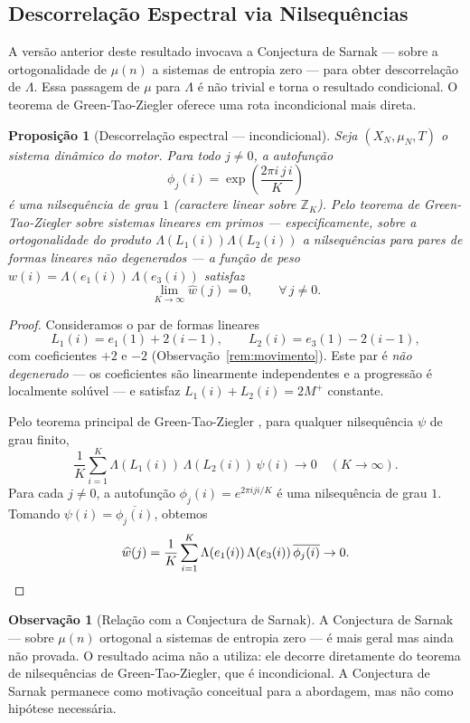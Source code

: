 \documentclass[12pt,a4paper]{article}
\newtheorem{proposition}[theorem]{Proposição}
\theoremstyle{definition}
\newtheorem{remark}[theorem]{Observação}
\newcommand{\Z}{\mathbb{Z}}
\begin{document}
	\subsection{Descorrelação Espectral via Nilsequências}
	
	A versão anterior deste resultado invocava a Conjectura de Sarnak
	\cite{sarnak} — sobre a ortogonalidade de $\mu(n)$ a sistemas de
	entropia zero — para obter descorrelação de $\Lambda$. Essa passagem
	de $\mu$ para $\Lambda$ é não trivial e torna o resultado condicional.
	O teorema de Green-Tao-Ziegler \cite{greentaoziegler} oferece uma rota
	incondicional mais direta.
	
	\begin{proposition}[Descorrelação espectral — incondicional]
		\label{prop:sarnak}
		Seja $(X_N, \mu_N, T)$ o sistema dinâmico do motor. Para todo
		$j \neq 0$, a autofunção
		\[
		\phi_j(i) = \exp\!\left(\frac{2\pi i\,j\,i}{K}\right)
		\]
		é uma nilsequência de grau $1$ (caractere linear sobre $\Z_K$).
		Pelo teorema de Green-Tao-Ziegler \cite{greentaoziegler} sobre
		sistemas lineares em primos — especificamente, sobre a
		ortogonalidade do produto $\Lambda(L_1(i))\Lambda(L_2(i))$ a
		nilsequências para pares de formas lineares não degenerados —
		a função de peso $w(i) = \Lambda(e_1(i))\,\Lambda(e_3(i))$ satisfaz
		\[
		\lim_{K\to\infty}\widehat{w}(j) = 0,\qquad \forall\, j \neq 0.
		\]
	\end{proposition}
	
	\begin{proof}
		Consideramos o par de formas lineares
		\[
		L_1(i) = e_1(1) + 2(i-1),\qquad L_2(i) = e_3(1) - 2(i-1),
		\]
		com coeficientes $+2$ e $-2$ (Observação~\ref{rem:movimento}).
		Este par é \emph{não degenerado} — os coeficientes são linearmente
		independentes e a progressão é localmente solúvel — e satisfaz
		$L_1(i) + L_2(i) = 2M^+$ constante.
		
		Pelo teorema principal de Green-Tao-Ziegler
		\cite{greentaoziegler}, para qualquer nilsequência $\psi$ de grau finito,
		\[
		\frac{1}{K}\sum_{i=1}^{K} \Lambda(L_1(i))\,\Lambda(L_2(i))\,\psi(i) \to 0
		\quad (K \to \infty).
		\]
		Para cada $j \neq 0$, a autofunção $\phi_j(i) = e^{2\pi i j i/K}$ é
		uma nilsequência de grau $1$.
		Tomando $\psi(i) = \overline{\phi_j(i)}$, obtemos
		\[
		\widehat{w}(j)
		= \frac{1}{K}\sum_{i=1}^{K} \Lambda(e_1(i))\,\Lambda(e_3(i))\,
		\overline{\phi_j(i)} \to 0. \qedhere
		\]
	\end{proof}
	
	\begin{remark}[Relação com a Conjectura de Sarnak]
		\label{rem:sarnak}
		A Conjectura de Sarnak \cite{sarnak} — sobre $\mu(n)$ ortogonal a
		sistemas de entropia zero — é mais geral mas ainda não provada. O
		resultado acima não a utiliza: ele decorre diretamente do teorema de
		nilsequências de Green-Tao-Ziegler, que é incondicional. A Conjectura
		de Sarnak permanece como motivação conceitual para a abordagem, mas
		não como hipótese necessária.
	\end{remark}
	
\end{document}
